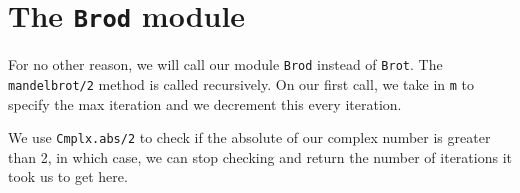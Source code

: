 \section{The \texttt{Brod} module}
For no other reason, we will call our module \texttt{Brod} instead of \texttt{Brot}.
The \texttt{mandelbrot/2} method is called recursively. On our first call, we take in \texttt{m} to specify the max iteration and we decrement this every iteration.

We use \texttt{Cmplx.abs/2} to check if the absolute of our complex number is greater than 2, in which case, we can stop checking and return the number of iterations it took us to get here.

